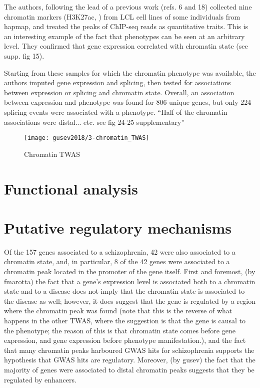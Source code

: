 \documentclass[../main.tex]{subfiles}
\begin{document}
The authors, following the lead of a previous work (refs. 6 and 18) 
collected nine chromatin markers (H3K27ac, \etc) from LCL cell lines of 
some individuals from hapmap, and treated the peaks of ChIP-seq reads as 
quantitative traits. This is an interesting example of the fact that 
phenotypes can be seen at an arbitrary level. They confirmed that gene 
expression correlated with chromatin state (see supp. fig 15).

Starting from these samples for which the chromatin phenotype was 
available, the authors imputed gene expression and splicing, then tested 
for associations between expression or splicing and chromatin state. 
Overall, an association between expression and phenotype was found for 
806 unique genes, but only 224 splicing events were associated with a 
	phenotype. \enquote{Half of the chromatin associations were 
distal... etc. see fig 24-25 supplementary}

\begin{figure}
	\texttt{[image: gusev2018/3-chromatin\_TWAS]}
	\caption{Chromatin TWAS}
\end{figure}

\section{Functional analysis}


\section{Putative regulatory mechanisms}

Of the 157 genes associated to a schizophrenia, 42 were also associated 
to a chromatin state, and, in particular, 8 of the 42 genes were 
associated to a chromatin peak located in the promoter of the gene 
itself. First and foremost, (by fmarotta) the fact that a gene's 
expression level is associated both to a chromatin state and to a 
disease does not imply that the chromatin state is associated to the 
disease as well; however, it does suggest that the gene is regulated by 
a region where the chromatin peak was found (note that this is the 
reverse of what happens in the other TWAS, where the suggestion is that 
the gene is causal to the phenotype; the reason of this is that 
chromatin state comes before gene expression, and gene expression before 
phenotype manifestation.), and the fact that many chromatin peaks 
harboured GWAS hits for schizophrenia supports the hypothesis that GWAS 
hits are regulatory. Moreover, (by gusev) the fact that the majority of 
genes were associated to distal chromatin peaks suggests that they be 
regulated by enhancers.
\end{document}
